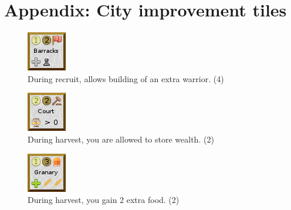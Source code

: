 \documentclass[11pt,a4paper,titlepage]{article}
\begin{document}
\newpage
\section{Appendix: City improvement tiles}{

  \begin{figure}[!htb]
    \begin{minipage}[c]{0.1\textwidth}
      \includegraphics[scale=.7]{doe_building_barracks.png}
    \end{minipage}\hfill
    \begin{minipage}[c]{0.7\textwidth}
      \captionsetup{labelformat=empty, justification=justified, singlelinecheck=false}
      \caption{During recruit, allows building of an extra warrior. (4)}
    \end{minipage}\hfill
    \label{fig:building_barracks}
  \end{figure}

  \begin{figure}[!htb]
    \begin{minipage}[c]{0.1\textwidth}
      \includegraphics[scale=.7]{doe_building_court.png}
    \end{minipage}\hfill
    \begin{minipage}[c]{0.7\textwidth}
      \captionsetup{labelformat=empty, justification=justified, singlelinecheck=false}
      \caption{During harvest, you are allowed to store wealth. (2)}
    \end{minipage}\hfill
    \label{fig:building_court}
  \end{figure}

  \begin{figure}[!htb]
    \begin{minipage}[c]{0.1\textwidth}
      \includegraphics[scale=.7]{doe_building_granary.png}
    \end{minipage}\hfill
    \begin{minipage}[c]{0.7\textwidth}
      \captionsetup{labelformat=empty, justification=justified, singlelinecheck=false}
      \caption{During harvest, you gain 2 extra food. (2)}
    \end{minipage}\hfill
    \label{fig:building_granary}
  \end{figure}

}
\end{document}

